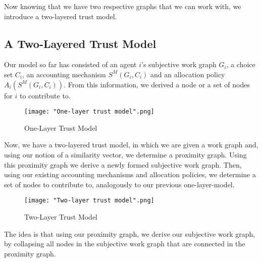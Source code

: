 \noindent{}Now knowing that we have two respective graphs that we can work with, we introduce a two-layered trust model.\vspace{1em}\\

\subsection{A Two-Layered Trust Model}
\label{subsec:A Two-Layered Trust Model}
Our model so far has consisted of an agent $i$'s subjective work graph $G_i$, a choice set $C_i$, an accounting mechanism $S^M(G_i,C_i)$ and an allocation policy $A_i(S^M(G_i,C_i))$. From this information, we derived a node or a set of nodes for $i$ to contribute to. 

\begin{figure}[H]
\begin{center}
\texttt{[image: "One-layer trust model".png]}
\caption{One-Layer Trust Model}
\label{fig:One-Layer Trust Model}
\end{center}
\end{figure}

\noindent{}Now, we have a two-layered trust model, in which we are given a work graph and, using our notion of a similarity vector, we determine a proximity graph. Using this proximity graph we derive a newly formed subjective work graph. Then, using our existing accounting mechanisms and allocation policies, we determine a set of nodes to contribute to, analogously to our previous one-layer-model. \vspace{1em}\\

\begin{figure}[H]
\texttt{[image: "Two-layer trust model".png]}
\caption{Two-Layer Trust Model}
\label{fig:Two-Layer Trust Model}
\end{figure}
\noindent{}The idea is that using our proximity graph, we derive our subjective work graph, by collapsing all nodes in the subjective work graph that are connected in the proximity graph. \vspace{1em}\\

